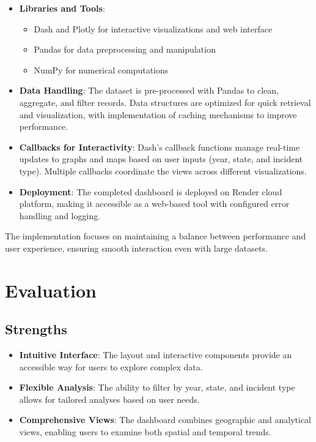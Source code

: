 \documentclass{article}
\begin{document}
\begin{itemize}
    \item \textbf{Libraries and Tools}:
    \begin{itemize}
        \item Dash and Plotly for interactive visualizations and web interface
        \item Pandas for data preprocessing and manipulation
        \item NumPy for numerical computations
    \end{itemize}
    
    \item \textbf{Data Handling}: 
    The dataset is pre-processed with Pandas to clean, aggregate, and filter records. Data structures are optimized for quick retrieval and visualization, with implementation of caching mechanisms to improve performance.
    
    \item \textbf{Callbacks for Interactivity}: 
    Dash's callback functions manage real-time updates to graphs and maps based on user inputs (year, state, and incident type). Multiple callbacks coordinate the views across different visualizations.
    
    \item \textbf{Deployment}: 
    The completed dashboard is deployed on Render cloud platform, making it accessible as a web-based tool with configured error handling and logging.
\end{itemize}

The implementation focuses on maintaining a balance between performance and user experience, ensuring smooth interaction even with large datasets.

\section{Evaluation}
\subsection{Strengths}
\begin{itemize}
    \item \textbf{Intuitive Interface}: The layout and interactive components provide an accessible way for users to explore complex data.
    \item \textbf{Flexible Analysis}: The ability to filter by year, state, and incident type allows for tailored analyses based on user needs.
    \item \textbf{Comprehensive Views}: The dashboard combines geographic and analytical views, enabling users to examine both spatial and temporal trends.
\end{itemize}
\end{document}
